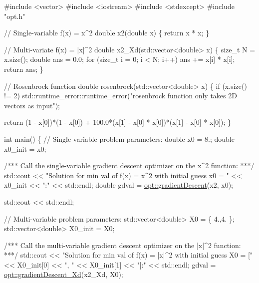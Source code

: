 \begin{DoxyCodeInclude}
\textcolor{preprocessor}{#include <vector>}
\textcolor{preprocessor}{#include <iostream>}
\textcolor{preprocessor}{#include <stdexcept>}
\textcolor{preprocessor}{#include "opt.h"}

\textcolor{comment}{// Single-variable f(x) = x^2}
\textcolor{keywordtype}{double} x2(\textcolor{keywordtype}{double} x)
\{
    \textcolor{keywordflow}{return} x * x;
\}

\textcolor{comment}{// Multi-variate f(x) = |x|^2}
\textcolor{keywordtype}{double} x2\_Xd(std::vector<double> x)
\{
    \textcolor{keywordtype}{size\_t} N = x.size();
    \textcolor{keywordtype}{double} ans = 0.0;
    \textcolor{keywordflow}{for} (\textcolor{keywordtype}{size\_t} i = 0; i < N; i++)
        ans += x[i] * x[i];
    \textcolor{keywordflow}{return} ans;
\}

\textcolor{comment}{// Rosenbrock function}
\textcolor{keywordtype}{double} rosenbrock(std::vector<double> x)
\{
    \textcolor{keywordflow}{if} (x.size() != 2)
        std::runtime\_error::runtime\_error(\textcolor{stringliteral}{"rosenbrock function only takes 2D vectors as input"});

    \textcolor{keywordflow}{return} (1 - x[0])*(1 - x[0]) + 100.0*(x[1] - x[0] * x[0])*(x[1] - x[0] * x[0]);
\}

\textcolor{keywordtype}{int} main()
\{
    \textcolor{comment}{// Single-variable problem parameters:}
    \textcolor{keywordtype}{double} x0 = 8.;
    \textcolor{keywordtype}{double} x0\_init = x0;

    \textcolor{comment}{/*** Call the single-variable gradient descent optimizer on the x^2 function: ***/}
    std::cout << \textcolor{stringliteral}{"Solution for min val of f(x) = x^2 with initial guess x0 = "} << x0\_init << \textcolor{stringliteral}{":"} << 
      std::endl;
    \textcolor{keywordtype}{double} gdval = \mbox{\hyperlink{namespaceopt_af1ef2e32062af31429ae74fc07c57fb0}{opt::gradientDescent}}(x2, x0);

    std::cout << std::endl;

    \textcolor{comment}{// Multi-variable problem parameters:}
    std::vector<double> X0 = \{ 4.,4. \};
    std::vector<double> X0\_init = X0;

    \textcolor{comment}{/*** Call the multi-variable gradient descent optimizer on the |x|^2 function: ***/}
    std::cout << \textcolor{stringliteral}{"Solution for min val of f(x) = |x|^2 with initial guess X0 = ["} << X0\_init[0] << \textcolor{stringliteral}{", "} << 
      X0\_init[1] << \textcolor{stringliteral}{"]:"} << std::endl;
    gdval = \mbox{\hyperlink{namespaceopt_a7db27c86e1c5a503b7f8373ba067d97b}{opt::gradientDescent\_Xd}}(x2\_Xd, X0);


\end{DoxyCodeInclude}
